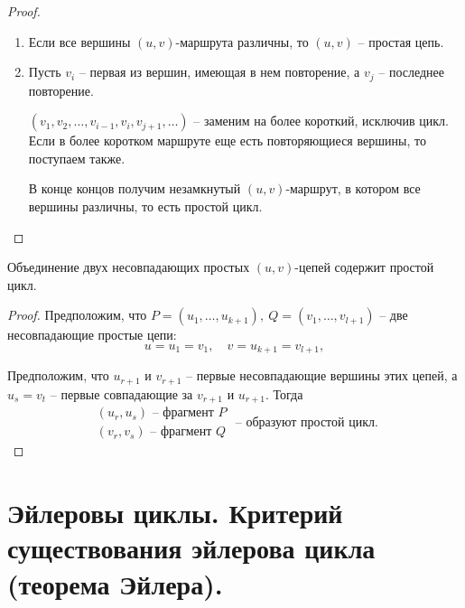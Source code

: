 \begin{proof}\leavevmode
    \begin{enumerate}
        \item Если все вершины $ (u,v) $-маршрута различны, то $ (u,v) $ -- простая цепь.
        \item Пусть $ v_i $ -- первая из вершин, имеющая в нем повторение, а $ v_j $ -- последнее повторение.
              \begin{figure}[H]
                  \centering
                  \label{fig:fig_07}
              \end{figure}

              $ (v_1,v_2,\ldots,v_{i-1},v_i,v_{j+1},\ldots) $ -- заменим на более короткий, исключив цикл. Если в более коротком маршруте еще есть повторяющиеся вершины, то поступаем также.

              В конце концов получим незамкнутый $ (u,v) $-маршрут, в котором все вершины различны, то есть простой цикл.
    \end{enumerate}
\end{proof}

\begin{lemma}
    Объединение двух несовпадающих простых $ (u,v) $-цепей содержит простой цикл.
\end{lemma}

\begin{proof}
    Предположим, что $ P = (u_1,\ldots,u_{k+1}), \ Q = (v_1,\ldots,v_{l+1}) $ -- две несовпадающие простые цепи:
    \[
        u = u_1 = v_1, \quad v = u_{k+1} = v_{l+1},
    \]
    \begin{figure}[H]
        \centering
        \label{fig:fig_08}
    \end{figure}

    Предположим, что $ u_{r+1} $ и $ v_{r+1} $ -- первые несовпадающие вершины этих цепей, а $ u_s = v_t $ -- первые совпадающие за $ v_{r+1} $ и $ u_{r+1} $. Тогда
    \[
        \begin{array}{l}
            (u_r,u_s) \text{ -- фрагмент } P \\
            (v_r,v_s) \text{ -- фрагмент } Q
        \end{array} \text{ -- образуют простой цикл.}
    \]
\end{proof}

\section{Эйлеровы циклы. Критерий существования эйлерова цикла (теорема Эйлера).}

